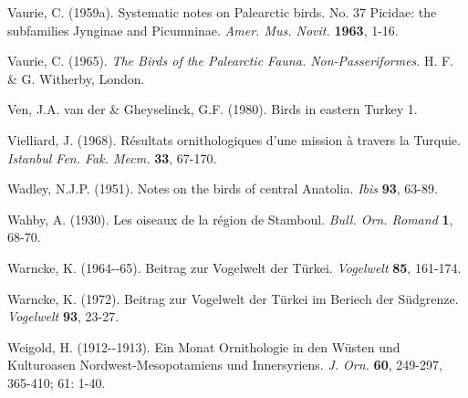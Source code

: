 \documentclass[
  10.5pt,
  a4paper,
  DIV=11,
  numbers=noendperiod,
  twocolumn]{scrreprt}
\newlength{\cslhangindent}
\newenvironment{CSLReferences}[2] %
 {\begin{list}{}{%
  \setlength{\itemindent}{0pt}
  \setlength{\leftmargin}{0pt}
  \setlength{\parsep}{0pt}
  \ifodd #1
   \setlength{\leftmargin}{\cslhangindent}
   \setlength{\itemindent}{-1\cslhangindent}
  \fi
  \setlength{\itemsep}{#2\baselineskip}}}
 {\end{list}}
\begin{document}
\begin{CSLReferences}{1}{1}
Vaurie, C. (1959a). {Systematic notes on Palearctic birds. No. 37
Picidae: the subfamilies Jynginae and Picumninae}. \emph{Amer. Mus.
Novit.} \textbf{1963}, 1-16.

Vaurie, C. (1965). \emph{{The Birds of the Palearctic Fauna.
Non-Passeriformes}}. H. F. \& G. Witherby, London.

Ven, J.A. van der \& Gheyselinck, G.F. (1980). {Birds in eastern Turkey
1}.

Vielliard, J. (1968). {Résultats ornithologiques d'une mission à travers
la Turquie}. \emph{Istanbul Fen. Fak. Mecm.} \textbf{33}, 67-170.

Wadley, N.J.P. (1951). {Notes on the birds of central Anatolia}.
\emph{Ibis} \textbf{93}, 63-89.

Wahby, A. (1930). {Les oiseaux de la région de Stamboul}. \emph{Bull.
Orn. Romand} \textbf{1}, 68-70.

Warncke, K. (1964-\/-65). {Beitrag zur Vogelwelt der Türkei}.
\emph{Vogelwelt} \textbf{85}, 161-174.

Warncke, K. (1972). {Beitrag zur Vogelwelt der Türkei im Beriech der
Südgrenze}. \emph{Vogelwelt} \textbf{93}, 23-27.

Weigold, H. (1912-\/-1913). {Ein Monat Ornithologie in den Wüsten und
Kulturoasen Nordwest-Mesopotamiens und Innersyriens}. \emph{J. Orn.}
\textbf{60}, 249-297, 365-410; 61: 1-40.

\end{CSLReferences}
\end{document}
